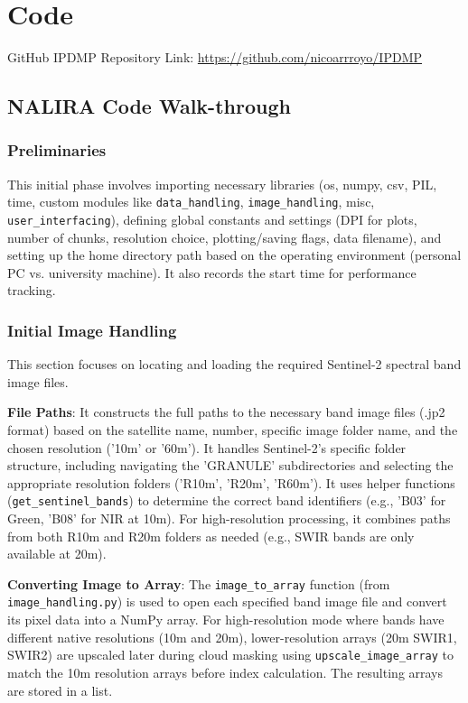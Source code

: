 \section{Code}
GitHub IPDMP Repository Link: \url{https://github.com/nicoarrroyo/IPDMP}

\subsection{NALIRA Code Walk-through}
\subsubsection{Preliminaries}
This initial phase involves importing necessary libraries (os, numpy, csv, PIL, time, custom modules like \verb|data_handling|, \verb|image_handling|, misc, \verb|user_interfacing|), defining global constants and settings (DPI for plots, number of chunks, resolution choice, plotting/saving flags, data filename), and setting up the home directory path based on the operating environment (personal PC vs. university machine). It also records the start time for performance tracking.

\subsubsection{Initial Image Handling}
This section focuses on locating and loading the required Sentinel-2 spectral band image files.

\textbf{File Paths}: It constructs the full paths to the necessary band image files (.jp2 format) based on the satellite name, number, specific image folder name, and the chosen resolution ('10m' or '60m'). It handles Sentinel-2's specific folder structure, including navigating the 'GRANULE' subdirectories and selecting the appropriate resolution folders ('R10m', 'R20m', 'R60m'). It uses helper functions (\verb|get_sentinel_bands|) to determine the correct band identifiers (e.g., 'B03' for Green, 'B08' for NIR at 10m). For high-resolution processing, it combines paths from both R10m and R20m folders as needed (e.g., SWIR bands are only available at 20m).

\textbf{Converting Image to Array}: The \verb|image_to_array| function (from \verb|image_handling.py|) is used to open each specified band image file and convert its pixel data into a NumPy array. For high-resolution mode where bands have different native resolutions (10m and 20m), lower-resolution arrays (20m SWIR1, SWIR2) are upscaled later during cloud masking using \verb|upscale_image_array| to match the 10m resolution arrays before index calculation. The resulting arrays are stored in a list.

